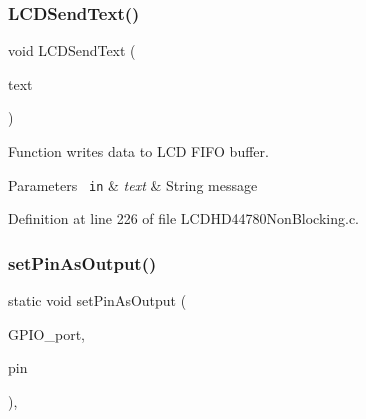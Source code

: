 \mbox{\label{group___l_c_d_h_d44780_non_blocking_ga198c4cf7d792789662bfa896f5066bb6_ga198c4cf7d792789662bfa896f5066bb6}} 
\subsubsection{\texorpdfstring{LCDSendText()}{LCDSendText()}}
{\footnotesize\ttfamily void L\+C\+D\+Send\+Text (\begin{DoxyParamCaption}\item[{char $\ast$}]{text }\end{DoxyParamCaption})}



Function writes data to L\+CD F\+I\+FO buffer. 


\begin{DoxyParams}[1]{Parameters}
\mbox{\texttt{ in}}  & {\em text} & String message \\
\hline
\end{DoxyParams}


Definition at line 226 of file L\+C\+D\+H\+D44780\+Non\+Blocking.\+c.

\mbox{\label{group___l_c_d_h_d44780_non_blocking_gad4759d75709e2b5bb8d5173a3907a3e6_gad4759d75709e2b5bb8d5173a3907a3e6}} 
\subsubsection{\texorpdfstring{setPinAsOutput()}{setPinAsOutput()}}
{\footnotesize\ttfamily static void set\+Pin\+As\+Output (\begin{DoxyParamCaption}\item[{G\+P\+I\+O\+\_\+\+Type\+Def $\ast$}]{G\+P\+I\+O\+\_\+port,  }\item[{uint32\+\_\+t}]{pin }\end{DoxyParamCaption})\hspace{0.3cm}{\ttfamily [inline]}, {\ttfamily [static]}}



